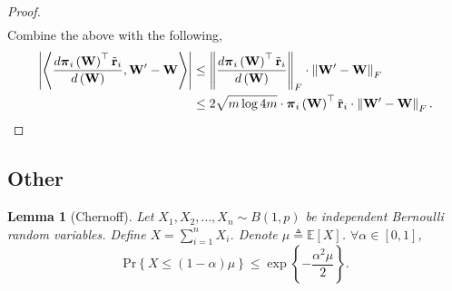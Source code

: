 \documentclass[10pt]{article}
\def\rvtilder{{\tilde{\mathbf{r}}}}
\def\pr{{\text{Pr}}}
\newtheorem{lem}{Lemma}
\def\rvpi{{\boldsymbol{\pi}}}
\def\rmW{{\mathbf{W}}}
\def\sE{{\mathbb{E}}}
\begin{document}
\begin{proof}
\begin{equation*}
\begin{split}
\end{split}
\end{equation*}
Combine the above with the following,
\begin{equation*}
\begin{split}
    \left| \left\langle \frac{d \rvpi_i\left( \rmW \right)^\top \rvtilder_i }{d\left( \rmW \right)}, \rmW^\prime - \rmW \right\rangle \right| &\le \left\| \frac{d \rvpi_i\left( \rmW \right)^\top \rvtilder_i }{d\left( \rmW \right)} \right\|_F \cdot \left\| \rmW^\prime - \rmW \right\|_F \\
    &\le 2 \sqrt{m \log{4m}} \cdot \rvpi_i\left( \rmW \right)^\top \rvtilder_i \cdot \left\| \rmW^\prime - \rmW \right\|_F. \qedhere
\end{split}
\end{equation*}
\end{proof}



\subsection{Other}

\begin{lem}[Chernoff]
    Let $X_1, X_2, \dots, X_n \sim B(1, p)$ be independent Bernoulli random variables. Define $X = \sum\limits_{i=1}^{n}{ X_i  }$. Denote $\mu \triangleq \sE\left[ X \right]$. $\forall \alpha \in [0,1]$,
\begin{equation*}
    \pr\left\{ X \le (1 - \alpha) \mu \right\} \le \exp\left\{ - \frac{\alpha^2 \mu}{2} \right\}.
\end{equation*}
\end{lem}

\begin{equation*}
\begin{split}
\end{split}
\end{equation*}
\end{document}
